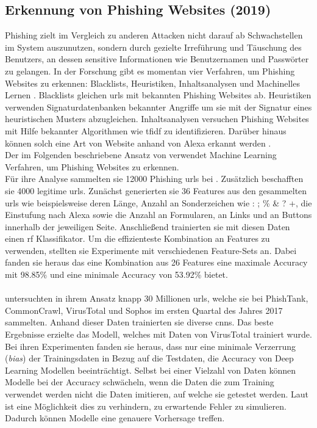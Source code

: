 \documentclass[
    12pt, %
    DIV10,
    ngerman, %
    a4paper, %
    oneside, %
    titlepage, %
    parskip=half, %
    headings=normal, %
    listof=totoc, %
    bibliography=totoc, %
    index=totoc, %
    captions=tableheading, %
    final %
]{scrreprt}
\begin{document}
\subsection{Erkennung von Phishing Websites (2019)}
Phishing zielt im Vergleich zu anderen Attacken nicht darauf ab Schwachstellen im System auszunutzen, sondern durch gezielte Irreführung und Täuschung des Benutzers, an dessen sensitive Informationen wie Benutzernamen und Passwörter zu gelangen.
In der Forschung gibt es momentan vier Verfahren, um Phishing Websites zu erkennen: Blacklists, Heuristiken, Inhaltsanalysen und Machinelles Lernen \parencite{Alswailem2019}. Blacklists gleichen \ac{urls} mit bekannten Phishing Websites ab. Heuristiken verwenden Signaturdatenbanken bekannter Angriffe um sie mit der Signatur eines heuristischen Musters abzugleichen. Inhaltsanalysen versuchen Phishing Websites mit Hilfe bekannter Algorithmen wie \ac{tfidf} zu identifizieren. Darüber hinaus können solch eine Art von Website anhand von Alexa erkannt werden \parencite{nguyen2013detecting}. \\
Der im Folgenden beschriebene Ansatz von \textcite{Alswailem2019} verwendet Machine Learning Verfahren, um Phishing Websites zu erkennen.\\
Für ihre Analyse sammelten sie 12000 Phishing \ac{urls} bei \textcite{PhishTank}. Zusätzlich beschafften sie 4000 legitime \ac{urls}. Zunächst generierten sie 36 Features aus den gesammelten \ac{urls} wie beispielsweise deren Länge, Anzahl an Sonderzeichen wie : ; \% \& ? +, die Einstufung nach Alexa sowie die Anzahl an Formularen, an Links und an Buttons innerhalb der jeweiligen Seite. Anschlie{\ss}end trainierten sie mit diesen Daten einen \ac{rf} Klassifikator. Um die effizienteste Kombination an Features zu verwenden, stellten sie Experimente mit verschiedenen Feature-Sets an. Dabei fanden sie heraus das eine Kombination aus 26 Features eine maximale Accuracy mit 98.85\% und eine minimale Accuracy von 53.92\% bietet. 
\\\\
\textcite{Hillary2017} untersuchten in ihrem Ansatz knapp 30 Millionen \ac{urls}, welche sie bei PhishTank, CommonCrawl, VirusTotal und Sophos im ersten Quartal des Jahres 2017 sammelten. Anhand dieser Daten trainierten sie diverse \ac{cnns}. Das beste Ergebnisse erzielte das Modell, welches mit Daten von VirusTotal trainiert wurde. Bei ihren Experimenten fanden sie heraus, dass nur eine minimale Verzerrung (\emph{bias}) der Trainingsdaten in Bezug auf die Testdaten, die Accuracy von Deep Learning Modellen beeinträchtigt. Selbst bei einer Vielzahl von Daten können Modelle bei der Accuracy schwächeln, wenn die Daten die zum Training verwendet werden nicht die Daten imitieren, auf welche sie getestet werden. Laut \textcite{Hillary2017} ist eine Möglichkeit dies zu verhindern, zu erwartende Fehler zu simulieren. Dadurch können Modelle eine genauere Vorhersage treffen.
%
\end{document}
